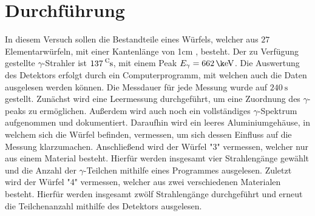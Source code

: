 \section{Durchführung}
In diesem Versuch sollen die Bestandteile eines Würfels, welcher aus $27$ Elementarwürfeln, mit einer Kantenlänge von 1cm , besteht. Der zu Verfügung gestellte $\gamma$-Strahler ist $\ce{137^Cs}$, mit einem Peak $E_{\gamma} = \SI{662}{\k \eV}$.
Die Auswertung des Detektors erfolgt durch ein Computerprogramm, mit welchen auch die Daten ausgelesen werden können.
Die Messdauer für jede Messung wurde auf $\SI{240}{\second}$ gestellt.
Zunächst wird eine Leermessung durchgeführt, um eine Zuordnung des $\gamma$-peaks zu ermöglichen. Außerdem wird auch noch ein vollständiges $\gamma$-Spektrum aufgenommen und dokumentiert.
Daraufhin wird ein leeres Aluminiumgehäuse, in welchem sich die Würfel befinden, vermessen, um sich dessen Einfluss auf die Messung klarzumachen.
Anschließend wird der Würfel "3" vermessen, welcher nur aus einem Material besteht. Hierfür werden insgesamt vier Strahlengänge gewählt und die Anzahl der $\gamma$-Teilchen mithilfe eines Programmes ausgelesen.
Zuletzt wird der Würfel "4" vermessen, welcher aus zwei verschiedenen Materialen besteht. Hierfür werden insgesamt zwölf Strahlengänge durchgeführt und erneut die Teilchenanzahl mithilfe des Detektors ausgelesen.